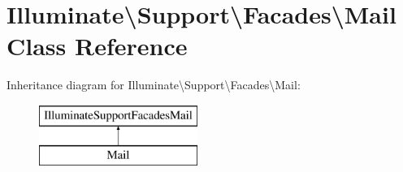 \hypertarget{class_illuminate_1_1_support_1_1_facades_1_1_mail}{}\section{Illuminate\textbackslash{}Support\textbackslash{}Facades\textbackslash{}Mail Class Reference}
\label{class_illuminate_1_1_support_1_1_facades_1_1_mail}
Inheritance diagram for Illuminate\textbackslash{}Support\textbackslash{}Facades\textbackslash{}Mail\+:\begin{figure}[H]
\begin{center}
\leavevmode
\includegraphics[height=2.000000cm]{class_illuminate_1_1_support_1_1_facades_1_1_mail}
\end{center}
\end{figure}
